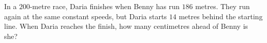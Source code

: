 In a $200$-metre race, Daria finishes when Benny has run $186$ metres. They run again at the same constant speeds, but Daria starts $14$ metres behind the starting line. When Daria reaches the finish, how many centimetres ahead of Benny is she?
